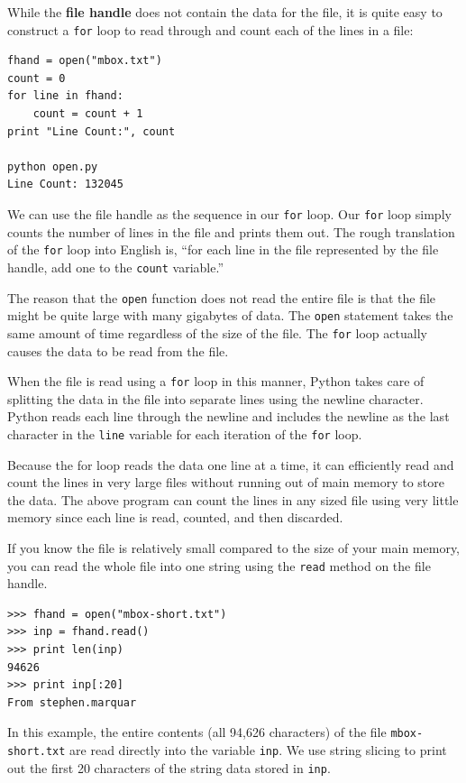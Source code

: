 \documentclass[10pt]{book}
\begin{document}
While the {\bf file handle} does not contain the data for the file,
it is quite easy to construct a {\tt for} loop to read through 
and count each of the lines in a file:

\beforeverb
\begin{verbatim}
fhand = open("mbox.txt")
count = 0
for line in fhand:
    count = count + 1
print "Line Count:", count

python open.py 
Line Count: 132045
\end{verbatim}
\afterverb
%
We can use the file handle as the sequence in our {\tt for} loop.  
Our {\tt for} loop simply counts the number of lines in the 
file and prints them out.  The rough translation of the {\tt for}
loop into English is, ``for each line in the file represented by the file
handle, add one to the {\tt count} variable.''

The reason that the {\tt open} function does not read the entire file
is that the file might be quite large with many gigabytes of data.
The {\tt open} statement takes the same amount of time regardless of the
size of the file.  The {\tt for} loop actually causes the data to be 
read from the file.

When the file is read using a {\tt for} loop in this manner, Python
takes care of splitting the data in the file into separate lines using
the newline character.  Python reads each line through 
the newline and includes
the newline as the last character in the {\tt line} variable for each 
iteration of the {\tt for} loop.

Because the for loop reads the data one line at a time, it can efficiently
read and count the lines in very large files without running 
out of main memory to store the data.  The above program can 
count the lines in any sized file using very little memory since 
each line is read, counted, and then discarded.

If you know the file is relatively small compared to the size of 
your main memory, you can read the whole file into one string
using the {\tt read} method on the file handle.

\beforeverb
\begin{verbatim}
>>> fhand = open("mbox-short.txt")
>>> inp = fhand.read()
>>> print len(inp)
94626
>>> print inp[:20]
From stephen.marquar
\end{verbatim}
\afterverb
%
In this example, the entire contents (all 94,626 characters) 
of the file {\tt mbox-short.txt} are read directly into the 
variable {\tt inp}.  We use string slicing to print out the first
20 characters of the string data stored in {\tt inp}.
\end{document}
